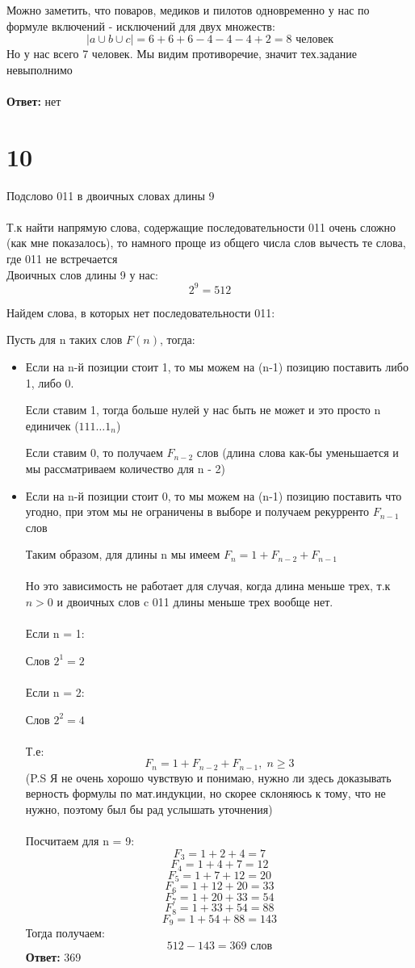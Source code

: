 \documentclass[a4paper,12pt]{article}
\begin{document}
Можно заметить, что поваров, медиков и пилотов одновременно у нас по формуле включений - исключений для двух множеств:
\[
|a \cup b \cup c| = 6 + 6 + 6 -4 - 4 - 4 + 2 = 8 \text{ человек}
\]
Но у нас всего 7 человек.
Мы видим противоречие, значит тех.задание невыполнимо\\\\
\textbf{Ответ:} нет
\section*{10}
Подслово 011 в двоичных словах длины 9
\\\\
Т.к найти напрямую слова, содержащие последовательности 011 очень сложно (как мне показалось), то намного проще из общего числа слов вычесть те слова, где 011 не встречается
\\

Двоичных слов длины 9 у нас:
\[
2^9 = 512 
\]

Найдем слова, в которых нет последовательности 011:

Пусть для n таких слов $F(n)$, тогда:
\begin{itemize}
\item Если на n-й позиции стоит 1, то мы можем на (n-1) позицию поставить либо 1, либо 0. 

Если ставим 1, тогда больше нулей у нас быть не может и это просто n единичек ($111\ldots 1_n$)

Если ставим 0, то получаем $F_{n-2}$ слов (длина слова как-бы уменьшается и мы рассматриваем количество для n - 2)
\item Если на n-й позиции стоит 0, то мы можем на (n-1) позицию поставить что угодно, при этом мы не ограничены в выборе и получаем рекурренто $F_{n-1}$ слов

Таким образом, для длины n мы имеем $F_n = 1 + F_{n-2} + F_{n-1}$
\\\\
Но это зависимость не работает для случая, когда длина меньше трех, т.к $ n > 0$ и двоичных слов c 011 длины меньше трех вообще нет. 
\\\\
Если n = 1:

Слов $2^1 = 2$
\\\\
Если n = 2:

Слов  $ 2^2 = 4$
\\\\
Т.е:
\[
F_n = 1 + F_{n-2} + F_{n-1}, \; n \geq 3
\]
(P.S Я не очень хорошо чувствую и понимаю, нужно ли здесь доказывать верность формулы по мат.индукции, но скорее склоняюсь к тому, что не нужно, поэтому был бы рад услышать уточнения)\\\\
Посчитаем для n = 9:
\[
F_3 = 1 + 2 + 4 = 7
\]
\[
F_4 = 1 + 4 + 7 = 12
\]
\[
F_5 = 1 + 7 + 12 = 20
\]
\[
F_6 = 1 + 12 + 20 = 33
\]
\[
F_7 = 1 + 20 + 33 = 54
\]
\[
F_8 = 1 + 33 + 54 = 88
\]
\[
F_9 = 1 + 54 + 88 = 143
\]
Тогда получаем:
\[
512 - 143 = 369 \text{ слов}
\]
\textbf{Ответ:} 369
\end{itemize}
\end{document}
